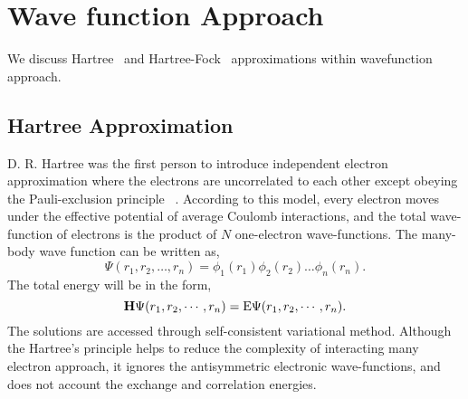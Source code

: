 \section{Wave function Approach}
We discuss Hartree~\citep{Hartree1928} and Hartree-Fock~\citep{Fock1930a} approximations within wavefunction approach. 
\subsection{Hartree Approximation}
D. R. Hartree was the first person to introduce independent electron approximation where the electrons are 
uncorrelated to each other except obeying the Pauli-exclusion principle ~\citep{Hartree1928}. According to this model, every electron moves under the effective potential of average Coulomb interactions, and the total wave-function of electrons is the product of $N$ one-electron wave-functions. The many-body wave function can be written as,
\begin{equation}
\Psi (r_1, r_2,\dots, r_n ) = \phi_1(r_1 )\phi_2(r_2 ) \dots \phi_n(r_n).
\end{equation}
The total energy  will be in the form,
\begin{equation*}
{\bf H}\Psi(r_{1} , r_{2} ,\cdots, r_{n} ) = {\rm E} \Psi(r_{1} , r_{2} ,\cdots, r_{n}).
\end{equation*}
The solutions are accessed through self-consistent variational method. Although the Hartree's principle helps to reduce the complexity of interacting many electron approach, it ignores the antisymmetric electronic wave-functions, and does not account the exchange and correlation energies. 
